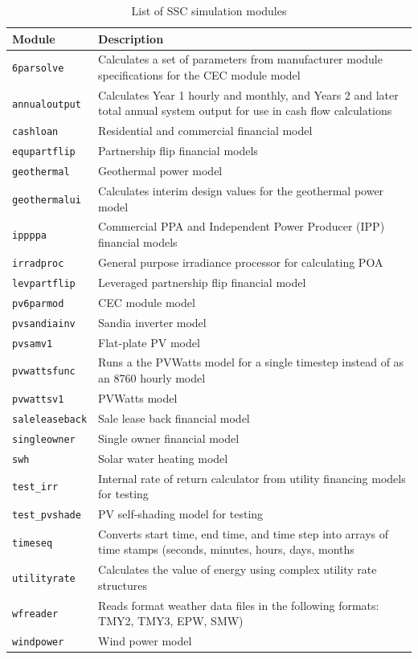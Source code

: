 \documentclass{article}
\begin{document}
\begin{table}
\begin{center}
\begin{tabular}{p{1in}p{4.5in}}
Module & Description\\\hline
\texttt{6parsolve} & Calculates a set of parameters from manufacturer module specifications for the CEC module model\\
\texttt{annualoutput} & Calculates Year 1 hourly and monthly, and Years 2 and later total annual system output for use in cash flow calculations\\
\texttt{cashloan} & Residential and commercial financial model\\
\texttt{equpartflip} & Partnership flip financial models\\
\texttt{geothermal} & Geothermal power model\\
\texttt{geothermalui} & Calculates interim design values for the geothermal power model\\
\texttt{ippppa} & Commercial PPA and Independent Power Producer (IPP) financial models\\
\texttt{irradproc} & General purpose irradiance processor for calculating POA\\
\texttt{levpartflip} & Leveraged partnership flip financial model\\
\texttt{pv6parmod} & CEC module model\\
\texttt{pvsandiainv} & Sandia inverter model\\
\texttt{pvsamv1} & Flat-plate PV model\\
\texttt{pvwattsfunc} & Runs a the PVWatts model for a single timestep instead of as an 8760 hourly model\\
\texttt{pvwattsv1} & PVWatts model\\
\texttt{saleleaseback} & Sale lease back financial model\\
\texttt{singleowner} & Single owner financial model\\
\texttt{swh} & Solar water heating model\\
\texttt{test\_irr} & Internal rate of return calculator from utility financing models for testing\\
\texttt{test\_pvshade} & PV self-shading model for testing\\
\texttt{timeseq} & Converts start time, end time, and time step into arrays of time stamps (seconds, minutes, hours, days, months\\
\texttt{utilityrate} & Calculates the value of energy using complex utility rate structures\\
\texttt{wfreader} & Reads format weather data files in the following formats: TMY2, TMY3, EPW, SMW)\\
\texttt{windpower} & Wind power model\\
\end{tabular}
\label{tab_modules}
\caption{List of SSC simulation modules}
\end{center}
\end{table}
\end{document}
